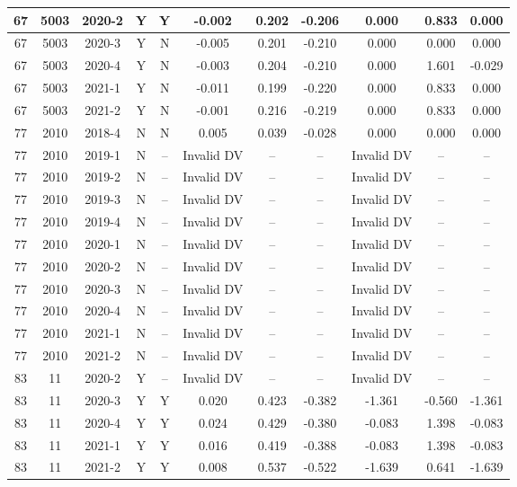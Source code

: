 \begin{landscape}
\begin{longtable}{@{}ccccc|ccc|ccc@{}}
67 & 5003 & 2020-2 & Y & Y & -0.002 & 0.202 & -0.206 & 0.000 & 0.833 & 0.000 \\* \midrule
67 & 5003 & 2020-3 & Y & N & -0.005 & 0.201 & -0.210 & 0.000 & 0.000 & 0.000 \\* \midrule
67 & 5003 & 2020-4 & Y & N & -0.003 & 0.204 & -0.210 & 0.000 & 1.601 & -0.029 \\* \midrule
67 & 5003 & 2021-1 & Y & N & -0.011 & 0.199 & -0.220 & 0.000 & 0.833 & 0.000 \\* \midrule
67 & 5003 & 2021-2 & Y & N & -0.001 & 0.216 & -0.219 & 0.000 & 0.833 & 0.000 \\* \midrule
77 & 2010 & 2018-4 & N & N & 0.005 & 0.039 & -0.028 & 0.000 & 0.000 & 0.000 \\* \midrule
77 & 2010 & 2019-1 & N & -- & Invalid DV & -- & -- & Invalid DV & -- & -- \\* \midrule
77 & 2010 & 2019-2 & N & -- & Invalid DV & -- & -- & Invalid DV & -- & -- \\* \midrule
77 & 2010 & 2019-3 & N & -- & Invalid DV & -- & -- & Invalid DV & -- & -- \\* \midrule
77 & 2010 & 2019-4 & N & -- & Invalid DV & -- & -- & Invalid DV & -- & -- \\* \midrule
77 & 2010 & 2020-1 & N & -- & Invalid DV & -- & -- & Invalid DV & -- & -- \\* \midrule
77 & 2010 & 2020-2 & N & -- & Invalid DV & -- & -- & Invalid DV & -- & -- \\* \midrule
77 & 2010 & 2020-3 & N & -- & Invalid DV & -- & -- & Invalid DV & -- & -- \\* \midrule
77 & 2010 & 2020-4 & N & -- & Invalid DV & -- & -- & Invalid DV & -- & -- \\* \midrule
77 & 2010 & 2021-1 & N & -- & Invalid DV & -- & -- & Invalid DV & -- & -- \\* \midrule
77 & 2010 & 2021-2 & N & -- & Invalid DV & -- & -- & Invalid DV & -- & -- \\* \midrule
83 & 11 & 2020-2 & Y & -- & Invalid DV & -- & -- & Invalid DV & -- & -- \\* \midrule
83 & 11 & 2020-3 & Y & Y & 0.020 & 0.423 & -0.382 & -1.361 & -0.560 & -1.361 \\* \midrule
83 & 11 & 2020-4 & Y & Y & 0.024 & 0.429 & -0.380 & -0.083 & 1.398 & -0.083 \\* \midrule
83 & 11 & 2021-1 & Y & Y & 0.016 & 0.419 & -0.388 & -0.083 & 1.398 & -0.083 \\* \midrule
83 & 11 & 2021-2 & Y & Y & 0.008 & 0.537 & -0.522 & -1.639 & 0.641 & -1.639 \\* \midrule

\end{longtable}
\end{landscape}
